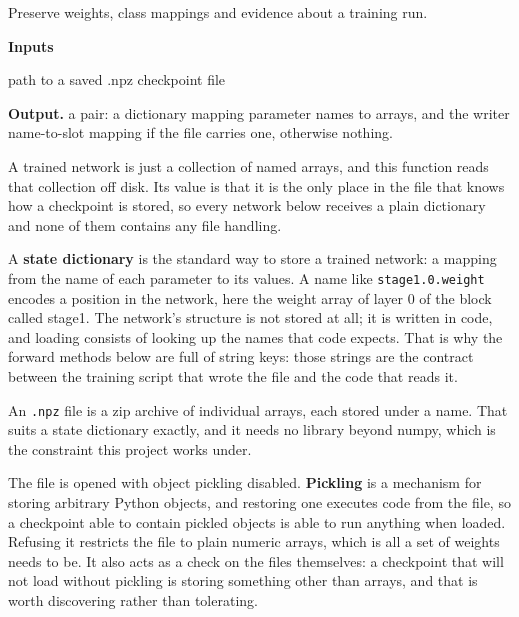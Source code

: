 Preserve weights, class mappings and evidence about a training run.




\noindent\textbf{Inputs}
\begin{description}[leftmargin=2.2em,style=nextline,font=\normalfont\ttfamily]\setlength\itemsep{1pt}
  \item[{checkpointPath}] \normalfont path to a saved .npz checkpoint file
\end{description}

\noindent\textbf{Output.} a pair: a dictionary mapping parameter names to arrays, and the writer name-to-slot mapping if the file carries one, otherwise nothing.


A trained network is just a collection of named arrays, and this function reads that collection off disk. Its value is that it is the only place in the file that knows how a checkpoint is stored, so every network below receives a plain dictionary and none of them contains any file handling.


A \textbf{state dictionary} is the standard way to store a trained network: a mapping from the name of each parameter to its values. A name like \texttt{stage1.0.weight} encodes a position in the network, here the weight array of layer 0 of the block called stage1. The network's structure is not stored at all; it is written in code, and loading consists of looking up the names that code expects. That is why the forward methods below are full of string keys: those strings are the contract between the training script that wrote the file and the code that reads it.


An \texttt{.npz} file is a zip archive of individual arrays, each stored under a name. That suits a state dictionary exactly, and it needs no library beyond numpy, which is the constraint this project works under.


The file is opened with object pickling disabled. \textbf{Pickling} is a mechanism for storing arbitrary Python objects, and restoring one executes code from the file, so a checkpoint able to contain pickled objects is able to run anything when loaded. Refusing it restricts the file to plain numeric arrays, which is all a set of weights needs to be. It also acts as a check on the files themselves: a checkpoint that will not load without pickling is storing something other than arrays, and that is worth discovering rather than tolerating.



